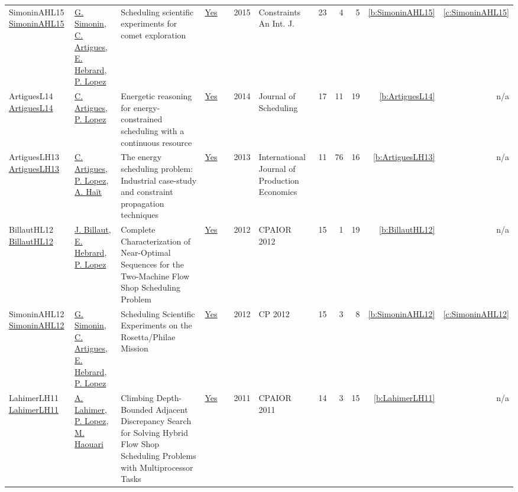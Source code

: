 {\begin{longtable}{>{\raggedright\arraybackslash}p{3cm}>{\raggedright\arraybackslash}p{6cm}>{\raggedright\arraybackslash}p{6.5cm}rrrp{2.5cm}rrrrr}
SimoninAHL15 \href{https://doi.org/10.1007/s10601-014-9169-3}{SimoninAHL15} & \hyperref[auth:a127]{G. Simonin}, \hyperref[auth:a6]{C. Artigues}, \hyperref[auth:a1]{E. Hebrard}, \hyperref[auth:a3]{P. Lopez} & Scheduling scientific experiments for comet exploration & \href{../works/SimoninAHL15.pdf}{Yes} & \cite{SimoninAHL15} & 2015 & Constraints An Int. J. & 23 & 4 & 5 & \ref{b:SimoninAHL15} & \ref{c:SimoninAHL15}\\
ArtiguesL14 \href{http://dx.doi.org/10.1007/s10951-014-0404-y}{ArtiguesL14} & \hyperref[auth:a6]{C. Artigues}, \hyperref[auth:a3]{P. Lopez} & Energetic reasoning for energy-constrained scheduling with a continuous resource & \href{../works/ArtiguesL14.pdf}{Yes} & \cite{ArtiguesL14} & 2014 & Journal of Scheduling & 17 & 11 & 19 & \ref{b:ArtiguesL14} & n/a\\
ArtiguesLH13 \href{http://dx.doi.org/10.1016/j.ijpe.2010.09.030}{ArtiguesLH13} & \hyperref[auth:a6]{C. Artigues}, \hyperref[auth:a3]{P. Lopez}, \hyperref[auth:a1180]{A. Haït} & The energy scheduling problem: Industrial case-study and constraint propagation techniques & \href{../works/ArtiguesLH13.pdf}{Yes} & \cite{ArtiguesLH13} & 2013 & International Journal of Production Economics & 11 & 76 & 16 & \ref{b:ArtiguesLH13} & n/a\\
BillautHL12 \href{https://doi.org/10.1007/978-3-642-29828-8_5}{BillautHL12} & \hyperref[auth:a340]{J. Billaut}, \hyperref[auth:a1]{E. Hebrard}, \hyperref[auth:a3]{P. Lopez} & Complete Characterization of Near-Optimal Sequences for the Two-Machine Flow Shop Scheduling Problem & \href{../works/BillautHL12.pdf}{Yes} & \cite{BillautHL12} & 2012 & CPAIOR 2012 & 15 & 1 & 19 & \ref{b:BillautHL12} & n/a\\
SimoninAHL12 \href{https://doi.org/10.1007/978-3-642-33558-7_5}{SimoninAHL12} & \hyperref[auth:a127]{G. Simonin}, \hyperref[auth:a6]{C. Artigues}, \hyperref[auth:a1]{E. Hebrard}, \hyperref[auth:a3]{P. Lopez} & Scheduling Scientific Experiments on the Rosetta/Philae Mission & \href{../works/SimoninAHL12.pdf}{Yes} & \cite{SimoninAHL12} & 2012 & CP 2012 & 15 & 3 & 8 & \ref{b:SimoninAHL12} & \ref{c:SimoninAHL12}\\
LahimerLH11 \href{https://doi.org/10.1007/978-3-642-21311-3_12}{LahimerLH11} & \hyperref[auth:a352]{A. Lahimer}, \hyperref[auth:a3]{P. Lopez}, \hyperref[auth:a353]{M. Haouari} & Climbing Depth-Bounded Adjacent Discrepancy Search for Solving Hybrid Flow Shop Scheduling Problems with Multiprocessor Tasks & \href{../works/LahimerLH11.pdf}{Yes} & \cite{LahimerLH11} & 2011 & CPAIOR 2011 & 14 & 3 & 15 & \ref{b:LahimerLH11} & n/a\\

\end{longtable}}
